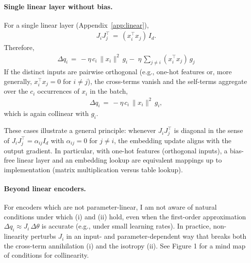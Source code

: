 \paragraph{Single linear layer without bias.}
For a single linear layer (Appendix~\ref{app:linear}),
\begin{align}
J_{i}J_{j}^{\!\top} \,=\, (x_i^{\!\top} x_j)\, I_d. \label{eq:JJ-linear}
\end{align}
Therefore,
\begin{align}
\Delta q_i \,=\, -\eta\,c_i\,\|x_i\|^2\,g_i -\; \eta\,\sum_{j\neq i}(x_i^{\!\top}x_j)\,g_j
\end{align}
If the distinct inputs are pairwise orthogonal (e.g., one-hot features or, more generally, $x_i^{\!\top}x_j=0$ for $i\neq j$), the cross-terms vanish and the self-terms aggregate over the $c_i$ occurrences of $x_i$ in the batch,
\begin{align}
\Delta q_i \,=\, -\eta\,c_i\,\|x_i\|^2\,g_i,
\end{align}
which is again collinear with $g_i$.

These cases illustrate a general principle: whenever $J_{i}J_{j}^{\!\top}$ is diagonal in the sense of \(J_{i}J_{j}^{\!\top} = \alpha_{ij} I_d\) with $\alpha_{ij}=0$ for $j\neq i$, the embedding update aligns with the output gradient. In particular, with one-hot features (orthogonal inputs), a bias-free linear layer and an embedding lookup are equivalent mappings up to implementation (matrix multiplication versus table lookup).

\paragraph{Beyond linear encoders.}\label{sec:beyond-linear}
For encoders which are not parameter-linear, I am not aware of natural conditions under which (i) and (ii) hold, even when the first-order approximation $\Delta q_i \approx J_i\,\Delta\theta$ is accurate (e.g., under small learning rates). In practice, non-linearity perturbs $J_i$ in an input- and parameter-dependent way that breaks both the cross-term annihilation (i) and the isotropy (ii). See Figure 1 for a mind map of conditions for collinearity.


